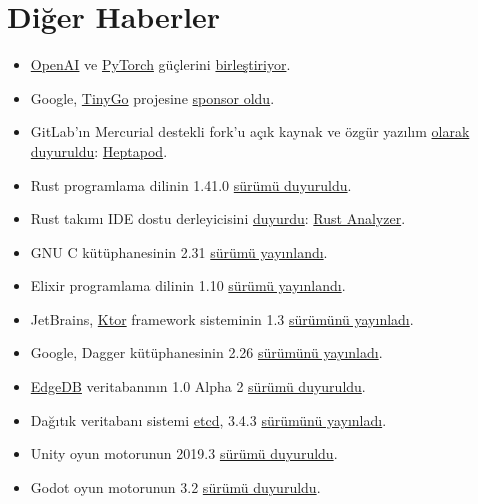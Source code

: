 \documentclass[11pt]{article}
\begin{document}
\section{Diğer Haberler}
\label{sec:org983e0cc}
\begin{itemize}
\item \href{https://openai.com/}{OpenAI} ve \href{https://pytorch.org/}{PyTorch} güçlerini \href{https://venturebeat.com/2020/01/30/openai-facebook-pytorch-google-tensorflow/}{birleştiriyor}.
\item Google, \href{https://tinygo.org/}{TinyGo} projesine \href{https://mobile.twitter.com/TinyGolang/status/1223887654158307328}{sponsor oldu}.
\item GitLab'ın Mercurial destekli fork'u açık kaynak ve özgür yazılım \href{https://heptapod.net/a-public-heptapod-for-free-and-open-source-software.html}{olarak
duyuruldu}: \href{https://heptapod.net/}{Heptapod}.
\item Rust programlama dilinin 1.41.0 \href{https://blog.rust-lang.org/2020/01/30/Rust-1.41.0.html}{sürümü duyuruldu}.
\item Rust takımı IDE dostu derleyicisini \href{https://www.infoq.com/news/2020/01/rust-analyser-ide-support/}{duyurdu}: \href{https://rust-analyzer.github.io/}{Rust Analyzer}.
\item GNU C kütüphanesinin 2.31 \href{https://lists.gnu.org/archive/html/info-gnu/2020-02/msg00001.html}{sürümü yayınlandı}.
\item Elixir programlama dilinin 1.10 \href{https://elixir-lang.org/blog/2020/01/27/elixir-v1-10-0-released/}{sürümü yayınlandı}.
\item JetBrains, \href{https://ktor.io/}{Ktor} framework sisteminin 1.3 \href{https://blog.jetbrains.com/kotlin/2020/01/ktor-1-3-release/}{sürümünü yayınladı}.
\item Google, Dagger kütüphanesinin 2.26 \href{https://github.com/google/dagger/releases/tag/dagger-2.26}{sürümünü yayınladı}.
\item \href{https://edgedb.com/}{EdgeDB} veritabanının 1.0 Alpha 2 \href{https://edgedb.com/blog/edgedb-1-0-alpha-2/}{sürümü duyuruldu}.
\item Dağıtık veritabanı sistemi \href{https://etcd.io/}{etcd}, 3.4.3 \href{https://etcd.io/blog/jepsen-343-results/}{sürümünü yayınladı}.
\item Unity oyun motorunun 2019.3 \href{https://blogs.unity3d.com/2020/01/28/unity-2019-3-is-now-available/}{sürümü duyuruldu}.
\item Godot oyun motorunun 3.2 \href{https://godotengine.org/article/here-comes-godot-3-2}{sürümü duyuruldu}.

\end{itemize}
\end{document}
